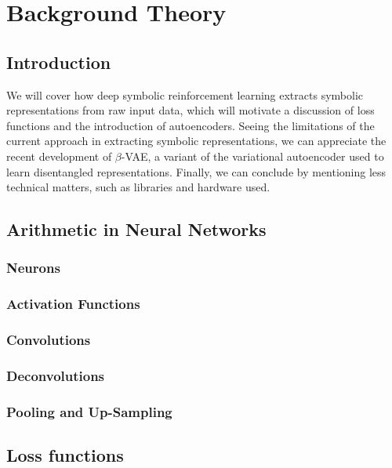 \chapter{Background Theory}

\label{ch:background}

\section{Introduction}

We will cover how deep symbolic reinforcement learning extracts symbolic representations from raw input data, which will motivate a discussion of loss functions and the introduction of autoencoders. Seeing the limitations of the current approach in extracting symbolic representations, we can appreciate the recent development of $\beta$-VAE, a variant of the variational autoencoder used to learn disentangled representations. Finally, we can conclude by mentioning less technical matters, such as libraries and hardware used.

\section{Arithmetic in Neural Networks}

\subsection{Neurons}

\subsection{Activation Functions}

\subsection{Convolutions}

\subsection{Deconvolutions}

\subsection{Pooling and Up-Sampling}


\section{Loss functions}

